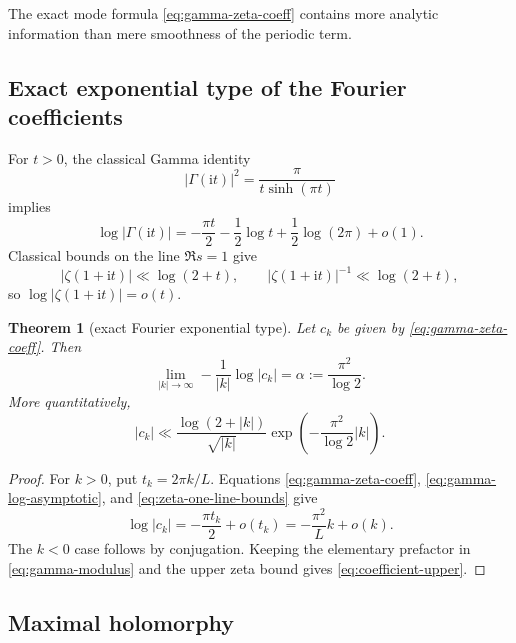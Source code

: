 \documentclass[11pt,oneside]{article}
\numberwithin{equation}{section}
\newtheorem{theorem}{Theorem}[section]
\theoremstyle{definition}
\theoremstyle{remark}
\newcommand{\ii}{\mathrm i}
\begin{document}
The exact mode formula \eqref{eq:gamma-zeta-coeff} contains more analytic information than
mere smoothness of the periodic term.

\subsection{Exact exponential type of the Fourier coefficients}

For $t>0$, the classical Gamma identity \cite{dlmf}
\begin{equation}
 |\Gamma(\ii t)|^2=\frac{\pi}{t\sinh(\pi t)}
 \label{eq:gamma-modulus}
\end{equation}
implies
\begin{equation}
 \log|\Gamma(\ii t)|
 =-\frac{\pi t}{2}-\frac12\log t+\frac12\log(2\pi)+o(1).
 \label{eq:gamma-log-asymptotic}
\end{equation}
Classical bounds on the line $\Re s=1$ \cite{titchmarsh,trudgian2014,trudgian2015} give
\begin{equation}
 |\zeta(1+\ii t)|\ll\log(2+t),
 \qquad
 |\zeta(1+\ii t)|^{-1}\ll\log(2+t),
 \label{eq:zeta-one-line-bounds}
\end{equation}
so $\log|\zeta(1+\ii t)|=o(t)$.

\begin{theorem}[exact Fourier exponential type]
\label{thm:coefficient-type}
Let $c_k$ be given by \eqref{eq:gamma-zeta-coeff}.  Then
\begin{equation}
 \boxed{\displaystyle
 \lim_{|k|\to\infty}-\frac{1}{|k|}\log|c_k|
 =\alpha:=\frac{\pi^2}{\log2}.}
 \label{eq:exact-coefficient-type}
\end{equation}
More quantitatively,
\begin{equation}
 |c_k|
 \ll\frac{\log(2+|k|)}{\sqrt{|k|}}
 \exp\!\left(-\frac{\pi^2}{\log2}|k|\right).
 \label{eq:coefficient-upper}
\end{equation}
\end{theorem}

\begin{proof}
For $k>0$, put $t_k=2\pi k/L$.  Equations
\eqref{eq:gamma-zeta-coeff}, \eqref{eq:gamma-log-asymptotic}, and
\eqref{eq:zeta-one-line-bounds} give
\[
 \log|c_k|=-\frac{\pi t_k}{2}+o(t_k)
 =-\frac{\pi^2}{L}k+o(k).
\]
The $k<0$ case follows by conjugation.  Keeping the elementary prefactor in
\eqref{eq:gamma-modulus} and the upper zeta bound gives
\eqref{eq:coefficient-upper}.
\end{proof}

\subsection{Maximal holomorphy}
\end{document}
